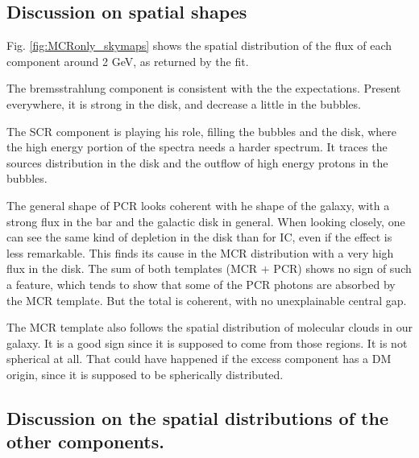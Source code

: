 \subsection{Discussion on spatial shapes}

Fig. \ref{fig:MCRonly_skymaps} shows the spatial distribution of the flux of each component around 2 GeV, as returned by the fit.

The bremsstrahlung component is consistent with the the expectations. Present everywhere, it is strong in the disk, and decrease a little in the bubbles.


The SCR component is playing his role, filling the bubbles and the disk, where the high energy portion of the spectra needs a harder spectrum. It traces the sources distribution in the disk and the outflow of high energy protons in the bubbles.

The general shape of PCR looks coherent with he shape of the galaxy, with a strong flux in the bar and the galactic disk in general. When looking closely, one can see the same kind of depletion in the disk than for IC, even if the effect is less remarkable. This finds its cause in the MCR distribution with a very high flux in the disk. The sum of both templates (MCR + PCR) shows no sign of such a feature, which tends to show that some of the PCR photons are absorbed by the MCR template. But the total is coherent, with no unexplainable central gap.

The MCR template also follows the spatial distribution of molecular clouds in our galaxy. It is a good sign since it is supposed to come from those regions.
It is not spherical at all. That could have happened if the excess component has a DM origin, since it is supposed to be spherically distributed.


\subsection{Discussion on the spatial distributions of the other components.}

